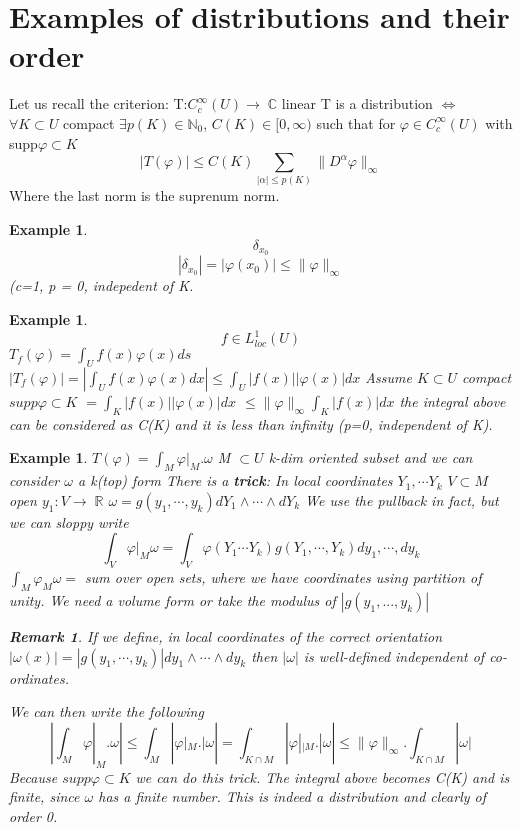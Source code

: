\documentclass[12pt, oneside, a4paper]{article}
\theoremstyle{dfn}
\newtheorem{rem}[thm]{Remark}
\newtheorem{ex}[thm]{Example}
\def\Rbb{\ensuremath{\mathbb{R}}}
\newcommand{\To}{\ensuremath{\rightarrow \;}}
\renewcommand{\phi}{\varphi}
\newcommand{\Com}{\mathbb{C}}
\begin{document}
\section{Examples of distributions and their order}
Let us recall the criterion:
T:$C^{\infty}_{c}(U) \To \Com$ linear 
T is a distribution $\iff$ $\forall K \subset U$ compact 
$\exists p(K) \in \mathbb{N}_0$, $C(K) \in [0,\infty)$ such that for 
$\phi \in C^{\infty}_{c}(U)$ with supp$\phi \subset K$
\begin{equation*}
 |T(\phi)| \leq C(K) \sum_{|\alpha|\leq p(K)}\|D^{\alpha}\phi\|_{\infty}
\end{equation*}
Where the last norm is the suprenum norm. 
\begin{ex}
 \begin{equation*}
  \delta_{x_{0}} 
 \end{equation*}
\begin{equation*}
 |\delta_{x_{0}}| = |\phi(x_{0})| \leq \|\phi \|_{\infty}
\end{equation*}
(c=1, p = 0, indepedent of K.
\end{ex}
\begin{ex}
 \begin{equation*}
  f \in L^1_{loc}(U) 
 \end{equation*}
$T_f(\phi) = \int_U f(x) \phi (x) ds$
$|T_f(\phi)| = |\int_U f(x) \phi(x) dx| \leq \int_U|f(x)||\phi(x)|dx$ 
Assume $K \subset U$ compact 
$supp \phi \subset K$ $=\int_K|f(x)||\phi(x)|dx$
$\leq \|\phi\|_\infty \int_K |f(x)|dx$
the integral above can be considered as C(K) and it is less than infinity (p=0, independent of K).
\end{ex}
\begin{ex}
 $T(\phi) = \int_M \phi|_M . \omega$
M $\subset U$ k-dim oriented subset and we can consider $\omega$ a k(top) form
There is a \textbf{trick}: In local coordinates $Y_1,\cdots Y_k$ $V\subset M$ open $y_1: V 
\To \Rbb$
$\omega = g(y_1,\cdots, y_k)dY_1\wedge \cdots \wedge dY_k$
We use the pullback in fact, but we can sloppy write 
\begin{equation*}
 \int_V \phi|_M \omega = \int_V \phi(Y_1 \cdots Y_k)g(Y_1,\cdots,Y_k)dy_1,\cdots, dy_k
\end{equation*}
$\int_M \phi_M \omega =$ sum over open sets, where we have coordinates using partition of unity. We need a volume form or 
take the modulus of $|g(y_1,...,y_k)|$
\begin{rem}
 If we define, in local coordinates of the correct orientation 
$|\omega(x)|=|g(y_1,\cdots,y_k)|dy_1 \wedge \cdots \wedge dy_k$
then $|\omega|$ is well-defined independent of co-ordinates.
\end{rem}
We can then write the following 
\begin{equation*}
 |\int_M \phi|_M . \omega| \leq \int_M|\phi|_M . |\omega| = \int_{K \cap M} |\phi|_{|M}.|\omega| 
\leq \|\phi\|_\infty . \int_{K \cap M} |\omega|
\end{equation*}
Because $supp \phi \subset K$ we can do this trick.
The integral above becomes C(K) and is finite, since $\omega$ has a finite number.
This is indeed a distribution and clearly of order 0.
\end{ex}
\end{document}
